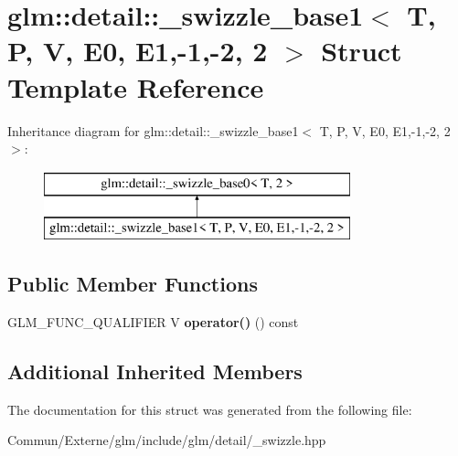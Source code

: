 \hypertarget{structglm_1_1detail_1_1__swizzle__base1_3_01_t_00_01_p_00_01_v_00_01_e0_00_01_e1_00-1_00-2_00_012_01_4}{}\section{glm\+:\+:detail\+:\+:\+\_\+swizzle\+\_\+base1$<$ T, P, V, E0, E1,-\/1,-\/2, 2 $>$ Struct Template Reference}
\label{structglm_1_1detail_1_1__swizzle__base1_3_01_t_00_01_p_00_01_v_00_01_e0_00_01_e1_00-1_00-2_00_012_01_4}
Inheritance diagram for glm\+:\+:detail\+:\+:\+\_\+swizzle\+\_\+base1$<$ T, P, V, E0, E1,-\/1,-\/2, 2 $>$\+:\begin{figure}[H]
\begin{center}
\leavevmode
\includegraphics[height=2.000000cm]{structglm_1_1detail_1_1__swizzle__base1_3_01_t_00_01_p_00_01_v_00_01_e0_00_01_e1_00-1_00-2_00_012_01_4}
\end{center}
\end{figure}
\subsection*{Public Member Functions}
\begin{DoxyCompactItemize}
\item 
G\+L\+M\+\_\+\+F\+U\+N\+C\+\_\+\+Q\+U\+A\+L\+I\+F\+I\+ER V {\bfseries operator()} () const \hypertarget{structglm_1_1detail_1_1__swizzle__base1_3_01_t_00_01_p_00_01_v_00_01_e0_00_01_e1_00-1_00-2_00_012_01_4_a333b1c869374c290a8bca707a258f5e5}{}\label{structglm_1_1detail_1_1__swizzle__base1_3_01_t_00_01_p_00_01_v_00_01_e0_00_01_e1_00-1_00-2_00_012_01_4_a333b1c869374c290a8bca707a258f5e5}

\end{DoxyCompactItemize}
\subsection*{Additional Inherited Members}


The documentation for this struct was generated from the following file\+:\begin{DoxyCompactItemize}
\item 
Commun/\+Externe/glm/include/glm/detail/\+\_\+swizzle.\+hpp\end{DoxyCompactItemize}
